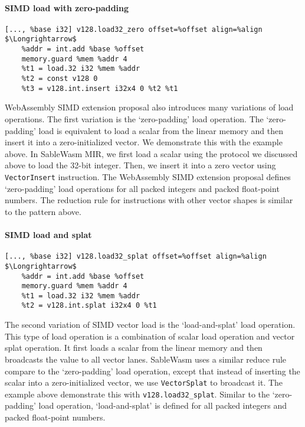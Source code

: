 \paragraph{SIMD load with zero-padding} \quad
\begin{lstlisting}[basicstyle=\linespread{1}\small\ttfamily, language=SableWasmMIR, mathescape=true]
[..., %base i32] v128.load32_zero offset=%offset align=%align $\Longrightarrow$
    %addr = int.add %base %offset
    memory.guard %mem %addr 4
    %t1 = load.32 i32 %mem %addr
    %t2 = const v128 0
    %t3 = v128.int.insert i32x4 0 %t2 %t1
\end{lstlisting}
WebAssembly SIMD extension proposal also introduces many variations of load operations. The first variation is the `zero-padding' load operation. The `zero-padding' load is equivalent to load a scalar from the linear memory and then insert it into a zero-initialized vector. We demonstrate this with the example above. In SableWasm MIR, we first load a scalar using the protocol we discussed above to load the 32-bit integer. Then, we insert it into a zero vector using \texttt{VectorInsert} instruction. The WebAssembly SIMD extension proposal defines `zero-padding' load operations for all packed integers and packed float-point numbers. The reduction rule for instructions with other vector shapes is similar to the pattern above.

\paragraph{SIMD load and splat} \quad
\begin{lstlisting}[basicstyle=\linespread{1}\small\ttfamily, language=SableWasmMIR, mathescape=true]
[..., %base i32] v128.load32_splat offset=%offset align=%align $\Longrightarrow$
    %addr = int.add %base %offset
    memory.guard %mem %addr 4
    %t1 = load.32 i32 %mem %addr
    %t2 = v128.int.splat i32x4 0 %t1
\end{lstlisting}
The second variation of SIMD vector load is the `load-and-splat' load operation. This type of load operation is a combination of scalar load operation and vector splat operation. It first loads a scalar from the linear memory and then broadcasts the value to all vector lanes. SableWasm uses a similar reduce rule compare to the `zero-padding' load operation, except that instead of inserting the scalar into a zero-initialized vector, we use \texttt{VectorSplat} to broadcast it. The example above demonstrate this with \texttt{v128.load32\_splat}. Similar to the `zero-padding' load operation, `load-and-splat' is defined for all packed integers and packed float-point numbers.

